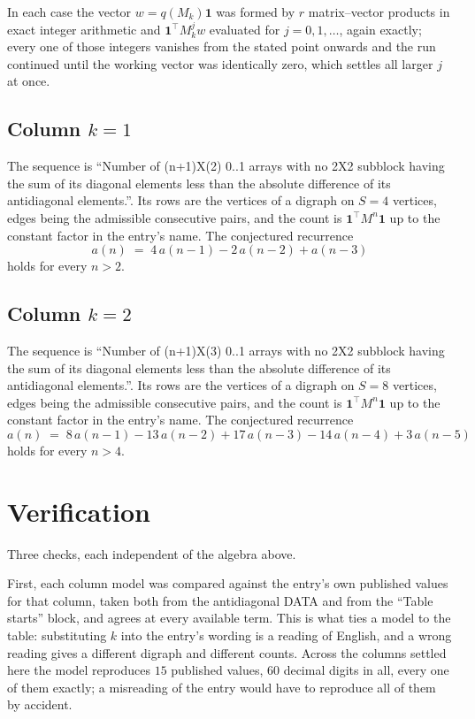 \documentclass[11pt,a4paper]{article}
\theoremstyle{plain}
\theoremstyle{definition}
\begin{document}
In each case the vector $w=q(M_k)\mathbf{1}$ was formed by $r$ matrix--vector products in
exact integer arithmetic and $\mathbf{1}^{\!\top}M_k^{j}w$ evaluated for $j=0,1,\dots$,
again exactly; every one of those integers vanishes from the stated point onwards and the run
continued until the working vector was identically zero, which settles all larger $j$ at once.

\subsection*{Column $k=1$}
The sequence is ``Number of (n+1)X(2) 0..1 arrays with no 2X2 subblock having the sum of its diagonal elements less than the absolute difference of its antidiagonal elements.''. Its rows are the vertices of a digraph on
$S=4$ vertices, edges being the admissible consecutive pairs, and the count is
$\mathbf{1}^{\!\top}M^{n}\mathbf{1}$ up to the constant factor in the entry's name.
The conjectured recurrence
\[
a(n)\;=\;4\,a(n-1) - 2\,a(n-2) + a(n-3)
\]
holds for every $n>2$.

\subsection*{Column $k=2$}
The sequence is ``Number of (n+1)X(3) 0..1 arrays with no 2X2 subblock having the sum of its diagonal elements less than the absolute difference of its antidiagonal elements.''. Its rows are the vertices of a digraph on
$S=8$ vertices, edges being the admissible consecutive pairs, and the count is
$\mathbf{1}^{\!\top}M^{n}\mathbf{1}$ up to the constant factor in the entry's name.
The conjectured recurrence
\[
a(n)\;=\;8\,a(n-1) - 13\,a(n-2) + 17\,a(n-3) - 14\,a(n-4) + 3\,a(n-5)
\]
holds for every $n>4$.

\section{Verification}

Three checks, each independent of the algebra above.

First, each column model was compared against the entry's own published values for that
column, taken both from the antidiagonal DATA and from the ``Table starts'' block, and agrees
at every available term. This is what ties a model to the table: substituting $k$ into the
entry's wording is a reading of English, and a wrong reading gives a different digraph and
different counts. Across the columns settled here the model reproduces $15$ published
values, $60$ decimal digits in all, every one of them exactly; a misreading of the entry
would have to reproduce all of them by accident.
\end{document}
